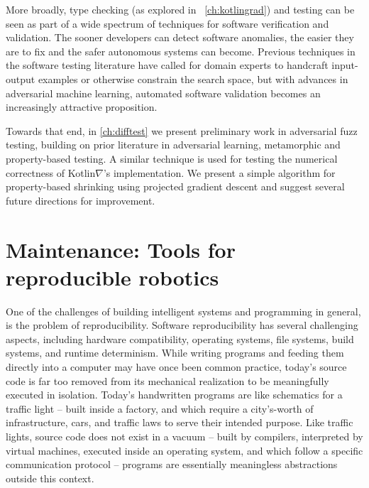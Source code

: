 \documentclass[12pt,initial,twoside,maitrise]{dms}
\numberwithin{equation}{section}
\numberwithin{table}{chapter}
\numberwithin{figure}{chapter}
\begin{document}
More broadly, type checking (as explored in ~\autoref{ch:kotlingrad}) and testing can be seen as part of a wide spectrum of techniques for software verification and validation. The sooner developers can detect software anomalies, the easier they are to fix and the safer autonomous systems can become. Previous techniques in the software testing literature have called for domain experts to handcraft input-output examples or otherwise constrain the search space, but with advances in adversarial machine learning, automated software validation becomes an increasingly attractive proposition.

Towards that end, in \autoref{ch:difftest} we present preliminary work in adversarial fuzz testing, building on prior literature in adversarial learning, metamorphic and property-based testing. A similar technique is used for testing the numerical correctness of Kotlin$\nabla$'s implementation. We present a simple algorithm for property-based shrinking using projected gradient descent and suggest several future directions for improvement.

\section{Maintenance: Tools for reproducible robotics}

One of the challenges of building intelligent systems and programming in general, is the problem of reproducibility. Software reproducibility has several challenging aspects, including hardware compatibility, operating systems, file systems, build systems, and runtime determinism. While writing programs and feeding them directly into a computer may have once been common practice, today's source code is far too removed from its mechanical realization to be meaningfully executed in isolation. Today's handwritten programs are like schematics for a traffic light -- built inside a factory, and which require a city's-worth of infrastructure, cars, and traffic laws to serve their intended purpose. Like traffic lights, source code does not exist in a vacuum -- built by compilers, interpreted by virtual machines, executed inside an operating system, and which follow a specific communication protocol -- programs are essentially meaningless abstractions outside this context.
\end{document}
